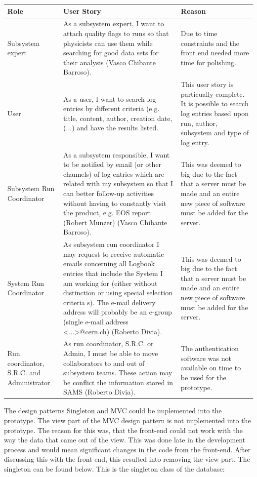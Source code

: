 \documentclass[paper=a4, fontsize=11pt,twoside]{scrartcl}	%
\begin{document}
\begin{longtable}{ | p{3cm} | p{7cm} | p{3cm}|}
\hline
Role & User Story & Reason \\ \hline
Subsystem expert & As a subsystem expert, I want to attach quality flags to runs so that physicists can use them while searching for good data sets for their analysis (Vasco Chibante Barroso).& Due to time constraints and the front end needed more time for polishing. \\ \hline
User & As a user, I want to search log entries by different criteria (e.g. title, content, author, creation date,(...) and have the results listed. & This user story is particually complete. It is possible to search log entries based upon run, author, subsystem and type of log entry. \\ \hline
Subsystem Run Coordinator &  As a subsystem responsible, I want to be notified by email (or other channels) of log entries which are related with my subsystem so that I can better follow-up activities without having to constantly visit the product, e.g. EOS report (Robert Munzer) (Vasco Chibante Barroso). & This was deemed to big due to the fact that a server must be made and an entire new piece of software must be added for the server. \\ \hline
System Run Coordinator & As subsystem run coordinator I may request to receive automatic emails concerning all Logbook entries that include the System I am working for (either without distinction or using special selection criteria s). The e-mail delivery address will probably be an e-group (single e-mail address <...>@cern.ch) (Roberto Divia). & This was deemed to big due to the fact that a server must be made and an entire new piece of software must be added for the server. \\ \hline
Run coordinator, S.R.C. and Administrator &  As run coordinator, S.R.C. or Admin, I must be able to move collaborators to and out of subsystem teams. These action may be conflict the information stored in SAMS (Roberto Divia). & The authentication software was not available on time to be used for the prototype. \\ \hline
\end{longtable}
The design patterns Singleton and MVC could be implemented into the prototype. The view part of the MVC design pattern is not implemented into the prototype. The reason for this was, that the front-end could not work with the way the data that came out of the view. This was done late in the development process and would mean significant changes in the code from the front-end. After discussing this with the front-end, this resulted into removing the view part. The singleton can be found below. This is the singleton class of the database:
\end{document}

